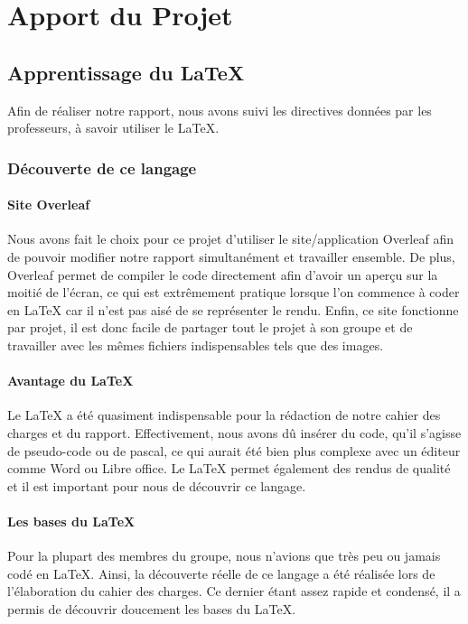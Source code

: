 \newpage
\section{Apport du Projet}

    \subsection{Apprentissage du \LaTeX}
        Afin de réaliser notre rapport, nous avons suivi les directives données par les professeurs, à savoir utiliser le \LaTeX{}.
        
        \subsubsection{Découverte de ce langage}
            \paragraph{Site Overleaf} Nous avons fait le choix pour ce projet d'utiliser le site/application Overleaf afin de pouvoir modifier notre rapport simultanément et travailler ensemble. De plus, Overleaf permet de compiler le code directement afin d'avoir un aperçu sur la moitié de l'écran, ce qui est extrêmement pratique lorsque l'on commence à coder en \LaTeX{} car il n'est pas aisé de se représenter le rendu. Enfin, ce site fonctionne par projet, il est donc facile de partager tout le projet à son groupe et de travailler avec les mêmes fichiers indispensables tels que des images.
            
            \paragraph{Avantage du \LaTeX{}} Le \LaTeX{} a été quasiment indispensable pour la rédaction de notre cahier des charges et du rapport. Effectivement, nous avons dû insérer du code, qu'il s'agisse de pseudo-code ou de pascal, ce qui aurait été bien plus complexe avec un éditeur comme Word ou Libre office. Le \LaTeX{} permet également des rendus de qualité et il est important pour nous de découvrir ce langage.
            
            \paragraph{Les bases du \LaTeX{}} Pour la plupart des membres du groupe, nous n'avions que très peu ou jamais codé en \LaTeX{}. Ainsi, la découverte réelle de ce langage a été réalisée lors de l'élaboration du cahier des charges. Ce dernier étant assez rapide et condensé, il a permis de découvrir doucement les bases du \LaTeX{}. 

